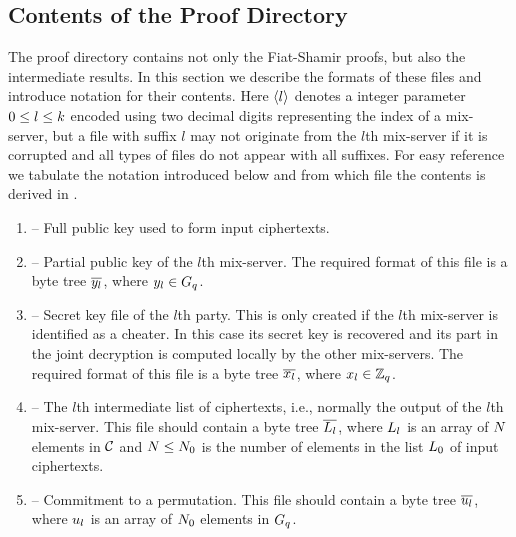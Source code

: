 \documentclass[11pt]{article}
\begin{document}
\subsection{Contents of the Proof Directory}\label{sect:inputs}

The proof directory contains not only the Fiat-Shamir proofs, but also
the intermediate results. In this section we describe the formats of
these files and introduce notation for their contents. Here
$\langle l\rangle$ denotes a integer parameter $0\leq l\leq k$ encoded
using two decimal digits representing the index of a mix-server, but a
file with suffix $l$ may not originate from the $l$th mix-server if it
is corrupted and all types of files do not appear with all
suffixes. For easy reference we tabulate the notation introduced below
and from which file the contents is derived in .
\begin{enumerate}

\item\label{poin:fullpk} -- Full public key
  used to form input ciphertexts.

\item\label{poin:pk} -- Partial public
  key of the $l$th mix-server. The required format of this file is a
  byte tree $\overline{y_{l}}$, where $y_{l}\in G_{q}$.

\item\label{poin:sk} -- Secret key
  file of the $l$th party. This is only created if the $l$th
  mix-server is identified as a cheater. In this case its secret key
  is recovered and its part in the joint decryption is computed
  locally by the other mix-servers. The required format of this file
  is a byte tree $\overline{x_{l}}$, where $x_{l}\in\mathbb{Z}_{q}$.

\item\label{poin:ciphs} -- The
  $l$th intermediate list of ciphertexts, i.e., normally the output of
  the $l$th mix-server. This file should contain a byte tree
  $\overline{L_{l}}$, where $L_{l}$ is an array of $N$ elements in
  $\mathcal{C}$ and $N\leq N_{0}$ is the number of elements in the list
  $L_{0}$ of input ciphertexts.

\item\label{poin:permcom}
  -- Commitment to a permutation. This file should contain a byte tree
  $\overline{u_{l}}$, where $u_{l}$ is an array of $N_{0}$
  elements in $G_{q}$.


\end{enumerate}
\end{document}
